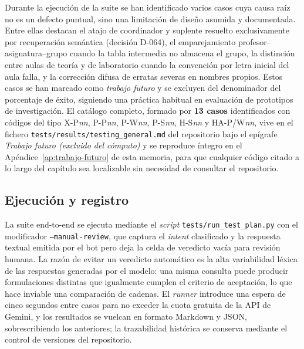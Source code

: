 Durante la ejecución de la suite se han identificado varios casos cuya causa raíz no es un defecto puntual, sino una limitación de diseño asumida y documentada. Entre ellas destacan el atajo de coordinador y suplente resuelto exclusivamente por recuperación semántica (decisión D-064), el emparejamiento profesor--asignatura--grupo cuando la tabla intermedia no almacena el grupo, la distinción entre aulas de teoría y de laboratorio cuando la convención por letra inicial del aula falla, y la corrección difusa de erratas severas en nombres propios. Estos casos se han marcado como \textit{trabajo futuro} y se excluyen del denominador del porcentaje de éxito, siguiendo una práctica habitual en evaluación de prototipos de investigación. El catálogo completo, formado por \textbf{13 casos} identificados con códigos del tipo X-P\textit{nn}, P-P\textit{nn}, P-W\textit{nn}, P-S\textit{nn}, H-S\textit{nn} y HA-P/W\textit{nn}, vive en el fichero \texttt{tests/results/testing\_general.md} del repositorio bajo el epígrafe \textit{Trabajo futuro (excluido del cómputo)} y se reproduce íntegro en el Apéndice~\ref{ap:trabajo-futuro} de esta memoria, para que cualquier código citado a lo largo del capítulo sea localizable sin necesidad de consultar el repositorio.

\subsection{Ejecución y registro}\label{subsec:pruebas-ejecucion}

La suite end-to-end se ejecuta mediante el \textit{script} \texttt{tests/run\_test\_plan.py} con el modificador \texttt{--manual-review}, que captura el \textit{intent} clasificado y la respuesta textual emitida por el bot pero deja la celda de veredicto vacía para revisión humana. La razón de evitar un veredicto automático es la alta variabilidad léxica de las respuestas generadas por el modelo: una misma consulta puede producir formulaciones distintas que igualmente cumplen el criterio de aceptación, lo que hace inviable una comparación de cadenas. El \textit{runner} introduce una espera de cinco segundos entre casos para no exceder la cuota gratuita de la API de Gemini, y los resultados se vuelcan en formato Markdown y JSON, sobrescribiendo los anteriores; la trazabilidad histórica se conserva mediante el control de versiones del repositorio.

